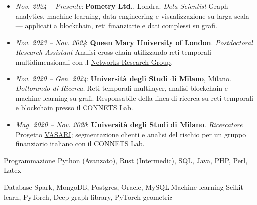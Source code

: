 \documentclass[11pt, a4paper]{awesome-cv}
\begin{document}
\begin{refsection}

\begin{itemize}
    \item \textit{Nov. 2024 – Presente}: \textbf{Pometry Ltd.}, Londra. \textit{Data Scientist}  
    Graph analytics, machine learning, data engineering e visualizzazione su larga scala — applicati a blockchain, reti finanziarie e dati complessi su grafi.

    \item \textit{Nov. 2023 – Nov. 2024}: \textbf{Queen Mary University of London}. \textit{Postdoctoral Research Assistant}
    Analisi cross‑chain utilizzando reti temporali multidimensionali con il \underline{\href{https://networks.eecs.qmul.ac.uk/}{Networks Research Group}}.

    \item \textit{Nov. 2020 – Gen. 2024}: \textbf{Università degli Studi di Milano}, Milano. \textit{Dottorando di Ricerca.}
    Reti temporali multilayer, analisi blockchain e machine learning su grafi. Responsabile della linea di ricerca su reti temporali e blockchain presso il \underline{\href{https://connets.di.unimi.it/}{CONNETS Lab}}.

    \item \textit{Mag. 2020 – Nov. 2020}: \textbf{Università degli Studi di Milano}. \textit{Ricercatore}  
    Progetto \href{https://www.vasariartexperience.it/}{VASARI}; segmentazione clienti e analisi del rischio per un gruppo finanziario italiano con il \underline{\href{https://connets.di.unimi.it/}{CONNETS Lab}}.  
\end{itemize}




\begin{cvskills}
  \cvskill
    {Programmazione} %
    {Python (Avanzato), Rust (Intermedio), SQL, Java, PHP, Perl, Latex} %
    

  \cvskill
    {Database} %
    {Spark, MongoDB, Postgres, Oracle, MySQL} %
  \cvskill
    {Machine learning} %
    {Scikit-learn, PyTorch, Deep graph library, PyTorch geometric} %


\end{cvskills}
\end{refsection}
\end{document}
